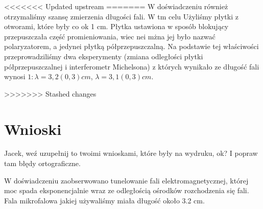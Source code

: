 \documentclass[a4paper,12pt]{article}
\begin{document}
<<<<<<< Updated upstream
=======
W doświadczeniu również otrzymaliśmy szansę zmierzenia długości fali. W tm celu Użyliśmy płytki z otworami, które były co ok 1 cm. Płytka ustawiona w sposób blokujący przepuszczała część promieniowania, wiec nei mżna jej było nazwać polaryzatorem, a jedynei płytką półprzepuszczalną. Na podstawie tej właściwości przeprowadziliśmy dwa eksperymenty (zmiana odległości płytki półprzepuszczalnej i interferometr Michelsona) z których wynikało ze długość fali wynosi $ 1: \lambda= 3,2 (0,3) cm  $, $ \lambda= 3,1 (0,3) cm $.


>>>>>>> Stashed changes
\section{Wnioski}

Jacek, weź uzupełnij to twoimi wnioskami, które były na wydruku, ok? I popraw tam błędy ortograficzne.


W doświadczeniu zaobserwowano tunelowanie fali elektromagnetycznej, której moc spada eksponencjalnie wraz ze odległością ośrodków rozchodzenia się fali. 
Fala mikrofalowa jakiej używaliśmy miała długość około 	3.2 cm.


  
\end{document}
